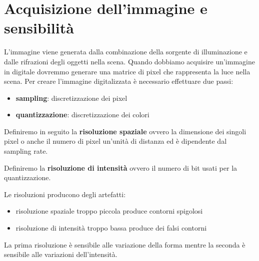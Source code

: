 \section{Acquisizione dell'immagine e sensibilità}
L'immagine viene generata dalla combinazione della sorgente di illuminazione e
dalle rifrazioni degli oggetti nella scena. Quando dobbiamo acquisire un'immagine
in digitale dovremmo generare una matrice di pixel che rappresenta la luce nella
scena. Per creare l'immagine digitalizzata è necessario effettuare due passi:
\begin{itemize}
    \item \textbf{sampling}: discretizzazione dei pixel
    \item \textbf{quantizzazione}: discretizzazione dei colori
\end{itemize}

Definiremo in seguito la \textbf{risoluzione spaziale} ovvero la dimensione dei
singoli pixel o anche il numero di pixel un'unità di distanza ed è dipendente dal
sampling rate.

Definiremo la \textbf{risoluzione di intensità} ovvero il numero di bit usati per
la quantizzazione.

Le risoluzioni producono degli artefatti:
\begin{itemize}
    \item risoluzione spaziale troppo piccola produce contorni spigolosi
    \item risoluzione di intensità troppo bassa produce dei falsi contorni
\end{itemize}

La prima risoluzione è sensibile alle variazione della forma mentre la seconda è
sensibile alle variazioni dell'intensità.

